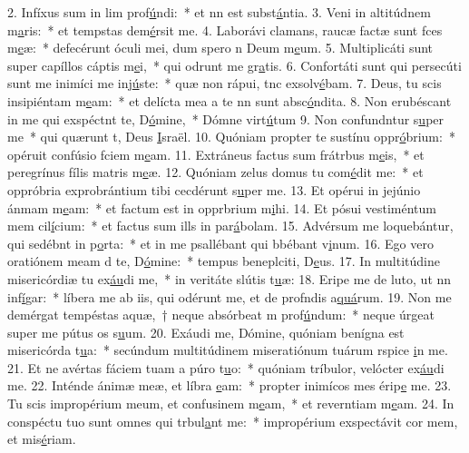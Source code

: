 2. Infíxus sum in lim prof\uline{ú}ndi:~* et nn est subst\uline{á}ntia.
3. Veni in altitúdnem m\uline{a}ris:~* et tempstas dem\uline{é}rsit me.
4. Laborávi clamans, raucæ factæ sunt fces m\uline{e}æ:~* defecérunt óculi mei, dum spero n Deum m\uline{e}um.
5. Multiplicáti sunt super capíllos cáptis m\uline{e}i,~* qui odrunt me gr\uline{a}tis.
6. Confortáti sunt qui persecúti sunt me inimíci me inj\uline{ú}ste:~* quæ non rápui, tnc exsolv\uline{é}bam.
7. Deus, tu scis insipiéntam m\uline{e}am:~* et delícta mea a te nn sunt absc\uline{ó}ndita.
8. Non erubéscant in me qui exspéctnt te, D\uline{ó}mine,~* Dómne virt\uline{ú}tum
9. Non confundntur s\uline{u}per me~* qui quærunt t, Deus \uline{I}sraël.
10. Quóniam propter te sustínu oppr\uline{ó}brium:~* opéruit confúsio fciem m\uline{e}am.
11. Extráneus factus sum frátrbus m\uline{e}is,~* et peregrínus fílis matris m\uline{e}æ.
12. Quóniam zelus domus tu com\uline{é}dit me:~* et oppróbria exprobrántium tibi cecdérunt s\uline{u}per me.
13. Et opérui in jejúnio ánmam m\uline{e}am:~* et factum est in opprbrium m\uline{i}hi.
14. Et pósui vestiméntum mem cil\uline{í}cium:~* et factus sum ills in par\uline{á}bolam.
15. Advérsum me loquebántur, qui sedébnt in p\uline{o}rta:~* et in me psallébant qui bbébant v\uline{i}num.
16. Ego vero oratiónem meam d te, D\uline{ó}mine:~* tempus beneplciti, D\uline{e}us.
17. In multitúdine misericórdiæ tu ex\uline{áu}di me,~* in veritáte slútis t\uline{u}æ:
18. Eripe me de luto, ut nn inf\uline{í}gar:~* líbera me ab iis, qui odérunt me, et de profndis a\uline{quá}rum.
19. Non me demérgat tempéstas aquæ,~† neque absórbeat m prof\uline{ú}ndum:~* neque úrgeat super me pútus os s\uline{u}um.
20. Exáudi me, Dómine, quóniam benígna est misericórda t\uline{u}a:~* secúndum multitúdinem miseratiónum tuárum rspice \uline{i}n me.
21. Et ne avértas fáciem tuam a púro t\uline{u}o:~* quóniam tríbulor, velócter ex\uline{áu}di me.
22. Inténde ánimæ meæ, et líbra \uline{e}am:~* propter inimícos mes érip\uline{e} me.
23. Tu scis impropérium meum, et confusinem m\uline{e}am,~* et reverntiam m\uline{e}am.
24. In conspéctu tuo sunt omnes qui trbul\uline{a}nt me:~* impropérium exspectávit cor mem, et mis\uline{é}riam.
